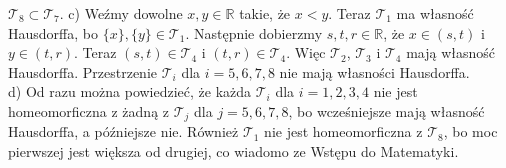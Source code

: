 \documentclass{article}
\theoremstyle{plain}%
\theoremstyle{definition}
\begin{document}
	$\mathcal{T}_{8}\subset\mathcal{T}_{7}$.
	c) Weźmy dowolne $x,y\in\mathbb{R}$ takie, że $x<y$. Teraz $\mathcal{T}_{1}$ ma własność Hausdorffa, bo $\{x\},\{y\}\in\mathcal{T}_{1}$. Następnie dobierzmy $s,t,r\in\mathbb{R}$, że $x\in(s,t)$ i $y\in(t,r)$. Teraz  $(s,t)\in\mathcal{T}_{4}$ i $(t,r)\in\mathcal{T}_{4}$. Więc $\mathcal{T}_{2}$, $\mathcal{T}_{3}$ i $\mathcal{T}_{4}$ mają własność Hausdorffa.
	Przestrzenie $\mathcal{T}_{i}$ dla $i=5,6,7,8$ nie mają własności Hausdorffa.\\
	d) Od razu można powiedzieć, że każda $\mathcal{T}_{i}$ dla $i=1,2,3,4$ nie jest homeomorficzna z żadną z $\mathcal{T}_{j}$ dla $j=5,6,7,8$, bo wcześniejsze mają własność Hausdorffa, a późniejsze nie. Również $\mathcal{T}_{1}$ nie jest homeomorficzna z $\mathcal{T}_{8}$, bo moc pierwszej jest większa od drugiej, co wiadomo ze Wstępu do Matematyki.
	\newpage
\end{document}
